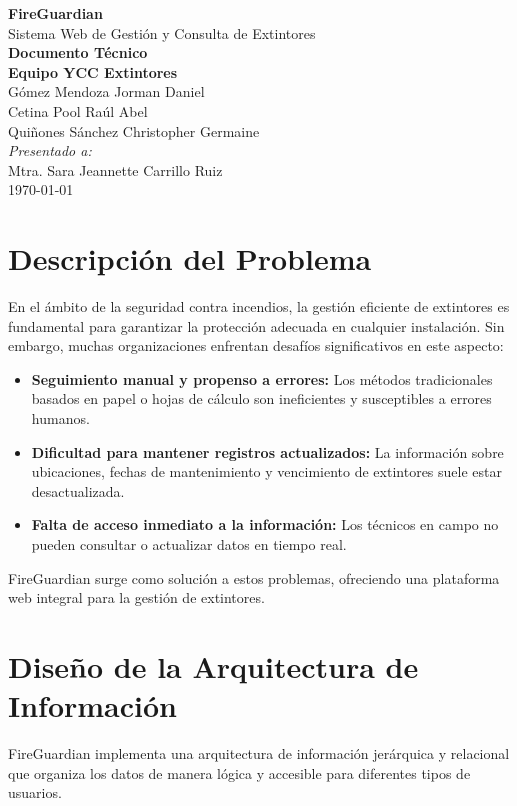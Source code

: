 \documentclass[11pt,a4paper]{article}
\begin{document}
\begin{center}
\huge\textbf{\textcolor{maincolor}{FireGuardian}}\\[0.5cm]
\Large Sistema Web de Gestión y Consulta de Extintores\\[1cm]
\large\textbf{Documento Técnico}\\[2cm]

\normalsize
\textbf{Equipo YCC Extintores}\\[0.3cm]
Gómez Mendoza Jorman Daniel\\
Cetina Pool Raúl Abel\\
Quiñones Sánchez Christopher Germaine\\[1cm]

\textit{Presentado a:}\\
Mtra. Sara Jeannette Carrillo Ruiz\\[2cm]

\today
\end{center}

\newpage

\section{Descripción del Problema}

En el ámbito de la seguridad contra incendios, la gestión eficiente de extintores es fundamental para garantizar la protección adecuada en cualquier instalación. Sin embargo, muchas organizaciones enfrentan desafíos significativos en este aspecto:

\begin{itemize}
    \item \textbf{Seguimiento manual y propenso a errores:} Los métodos tradicionales basados en papel o hojas de cálculo son ineficientes y susceptibles a errores humanos.
    \item \textbf{Dificultad para mantener registros actualizados:} La información sobre ubicaciones, fechas de mantenimiento y vencimiento de extintores suele estar desactualizada.
    \item \textbf{Falta de acceso inmediato a la información:} Los técnicos en campo no pueden consultar o actualizar datos en tiempo real.
\end{itemize}

FireGuardian surge como solución a estos problemas, ofreciendo una plataforma web integral para la gestión de extintores.

\section{Diseño de la Arquitectura de Información}

FireGuardian implementa una arquitectura de información jerárquica y relacional que organiza los datos de manera lógica y accesible para diferentes tipos de usuarios.
\end{document}
